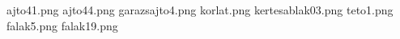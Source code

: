 ajto41.png
ajto44.png
garazsajto4.png
korlat.png
kertesablak03.png
teto1.png
falak5.png
falak19.png
